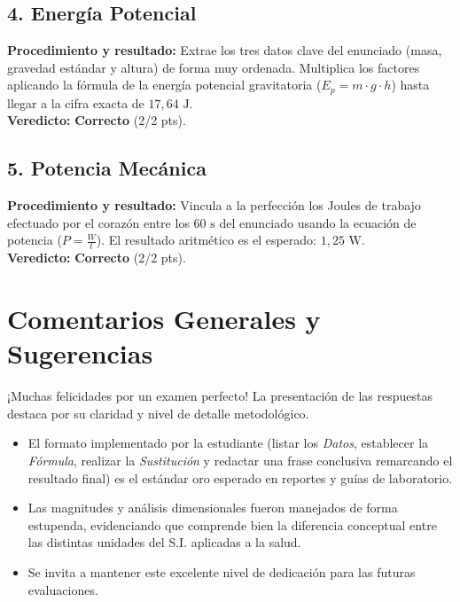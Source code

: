 \documentclass[12pt,letterpaper]{article}
\begin{document}
\subsection*{4. Energía Potencial}
\textbf{Procedimiento y resultado:} Extrae los tres datos clave del enunciado (masa, gravedad estándar y altura) de forma muy ordenada. Multiplica los factores aplicando la fórmula de la energía potencial gravitatoria ($E_p = m \cdot g \cdot h$) hasta llegar a la cifra exacta de $17,64 \text{ J}$. \\
\textbf{Veredicto:} \textbf{Correcto} (2/2 pts).

\subsection*{5. Potencia Mecánica}
\textbf{Procedimiento y resultado:} Vincula a la perfección los Joules de trabajo efectuado por el corazón entre los $60 \text{ s}$ del enunciado usando la ecuación de potencia ($P = \frac{W}{t}$). El resultado aritmético es el esperado: $1,25 \text{ W}$. \\
\textbf{Veredicto:} \textbf{Correcto} (2/2 pts).

\vspace{0.5cm}
\section*{Comentarios Generales y Sugerencias}
¡Muchas felicidades por un examen perfecto! La presentación de las respuestas destaca por su claridad y nivel de detalle metodológico.
\begin{itemize}
    \item El formato implementado por la estudiante (listar los \textit{Datos}, establecer la \textit{Fórmula}, realizar la \textit{Sustitución} y redactar una frase conclusiva remarcando el resultado final) es el estándar oro esperado en reportes y guías de laboratorio.
    \item Las magnitudes y análisis dimensionales fueron manejados de forma estupenda, evidenciando que comprende bien la diferencia conceptual entre las distintas unidades del S.I. aplicadas a la salud.
    \item Se invita a mantener este excelente nivel de dedicación para las futuras evaluaciones.
\end{itemize}
\end{document}
